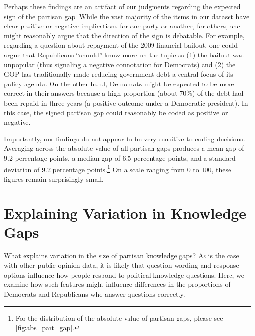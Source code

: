 \documentclass[12pt, letterpaper]{article}
\begin{document}
Perhaps these findings are an artifact of our judgments regarding the expected sign of the partisan gap. While the vast majority of the items in our dataset have clear positive or negative implications for one party or another, for others, one might reasonably argue that the direction of the sign is debatable. For example, regarding a question about repayment of the 2009 financial bailout, one could argue that Republicans ``should'' know more on the topic as (1) the bailout was unpopular (thus signaling a negative connotation for Democrats) and (2) the GOP has traditionally made reducing government debt a central focus of its policy agenda. On the other hand, Democrats might be expected to be more correct in their answers because a high proportion (about 70\%) of the debt had been repaid in three years (a positive outcome under a Democratic president). In this case, the signed partisan gap could reasonably be coded as positive or negative. 

Importantly, our findings do not appear to be very sensitive to coding decisions. Averaging across the absolute value of all partisan gaps produces a mean gap of 9.2 percentage points, a median gap of 6.5 percentage points, and a standard deviation of 9.2 percentage points.\footnote{For the distribution of the absolute value of partisan gaps, please see \ref{fig:abs_part_gap}.} On a scale ranging from 0 to 100, these figures remain surprisingly small. 

\section*{Explaining Variation in Knowledge Gaps}

What explains variation in the size of partisan knowledge gaps? As is the case with other public opinion data, it is likely that question wording and response options influence how people respond to political knowledge questions. Here, we examine how such features might influence differences in the proportions of Democrats and Republicans who answer questions correctly.
\end{document}
